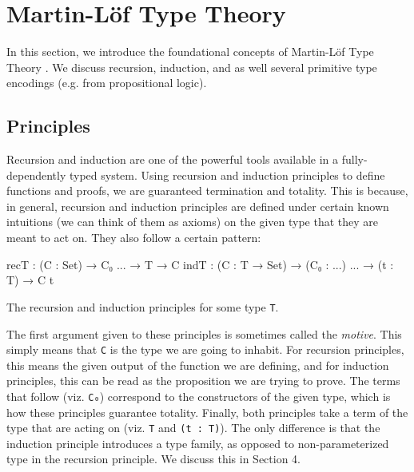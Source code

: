 \documentclass[12pt]{article}
\begin{document}
\section{Martin-L\"of Type Theory}
In this section, we introduce the foundational concepts of Martin-L\"of Type
Theory \cite{}. We discuss recursion, induction, and as well several primitive type
encodings (e.g. from propositional logic).

\subsection*{Principles}
Recursion and induction are one of the powerful tools available in a
fully-dependently typed system. Using recursion and induction principles to
define functions and proofs, we are guaranteed termination and totality. This is
because, in general, recursion and induction principles are defined under certain
known intuitions (we can think of them as axioms) on the given type that they are
meant to act on. They also follow a certain pattern:
\begin{center}
\begin{minipage}{0.9\textwidth}
\begin{code}
recT : (C : Set) → C₀ ... → T → C
indT : (C : T → Set) → (C₀ : ...) ... → (t : T) → C t
\end{code}
\end{minipage}

\begin{minipage}{0.7\textwidth}
\begin{small}
The recursion and induction principles for some type {\tt T}.
\end{small}
\end{minipage}
\end{center}
The first argument given to these principles is sometimes called the {\em motive}.
This simply means that {\tt C} is the type we are going to inhabit. For recursion
principles, this means the given output of the function we are defining, and for
induction principles, this can be read as the proposition we are trying to prove.
The terms that follow (viz. {\tt C₀}) correspond to the constructors of the given
type, which is how these principles guarantee totality. Finally, both principles
take a term of the type that are acting on (viz. {\tt T} and {\tt (t : T)}). The
only difference is that the induction principle introduces a type family, as
opposed to non-parameterized type in the recursion principle. We discuss this in
Section 4.
\end{document}
